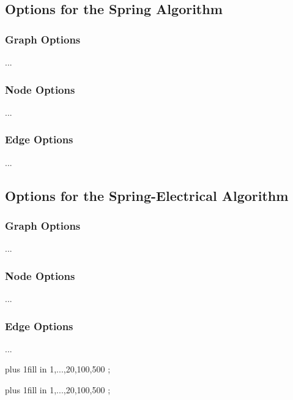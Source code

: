 \subsection{Options for the Spring Algorithm}

\subsubsection{Graph Options}

...

\subsubsection{Node Options}

...

\subsubsection{Edge Options}

...

\subsection{Options for the Spring-Electrical Algorithm}

\subsubsection{Graph Options}

...

\subsubsection{Node Options}

...

\subsubsection{Edge Options}

...

\begin{codeexample}[]
\vbox{ \hsize=16cm \rightskip=0cm plus 1fill
  \foreach \iterations in {1,...,20,100,500}
  {
    \tikz {};
  }
}
\end{codeexample}

\begin{codeexample}[]
\vbox{ \hsize=16cm \rightskip=0cm plus 1fill
  \foreach \iterations in {1,...,20,100,500}
  {
    \tikz {};
  }
}
\end{codeexample}

